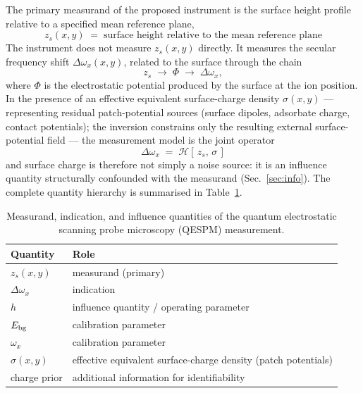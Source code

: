 \documentclass[12pt,a4paper]{article}
\begin{document}
The primary measurand of the proposed instrument is the surface height
profile relative to a specified mean reference plane,
\begin{equation}
\boxed{\; z_s(x,y) \;=\; \text{surface height relative to the mean reference plane} \;}
\end{equation}
The instrument does not measure $z_s(x,y)$ directly.  It measures the
secular frequency shift $\Delta\omega_x(x,y)$, related to the surface
through the chain
\begin{equation}
z_s \; \longrightarrow \; \Phi \; \longrightarrow \; \Delta\omega_x,
\end{equation}
where $\Phi$ is the electrostatic potential produced by the surface at the
ion position.  In the presence of an effective equivalent surface-charge
density $\sigma(x,y)$ --- representing residual patch-potential sources
(surface dipoles, adsorbate charge, contact potentials); the inversion
constrains only the resulting external surface-potential field --- the
measurement model is the joint operator
\begin{equation}
\boxed{\; \Delta\omega_x \;=\; \mathcal{H}[\,z_s,\,\sigma\,] \;}
\end{equation}
and surface charge is therefore not simply a noise source: it is an
influence quantity structurally confounded with the measurand
(Sec.~\ref{sec:info}).  The complete quantity hierarchy is summarised in
Table~\ref{tab:quantities}.

\begin{table}[htb]
\centering
\caption{Measurand, indication, and influence quantities of the
quantum electrostatic scanning probe microscopy (QESPM) measurement.}
\label{tab:quantities}
\small
\begin{tabular}{@{}ll@{}}
\hline
Quantity & Role \\
\hline
$z_s(x,y)$ & measurand (primary) \\
$\Delta\omega_x$ & indication \\
$h$ & influence quantity / operating parameter \\
$E_{\rm bg}$ & calibration parameter \\
$\omega_x$ & calibration parameter \\
$\sigma(x,y)$ & effective equivalent surface-charge density
(patch potentials) \\
charge prior & additional information for identifiability \\
\hline
\end{tabular}
\end{table}
\end{document}
